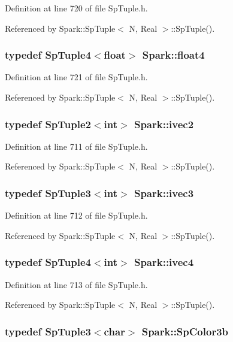 Definition at line 720 of file Sp\-Tuple.h.

Referenced by Spark::Sp\-Tuple$<$ N, Real $>$::Sp\-Tuple().
\subsubsection{\setlength{\rightskip}{0pt plus 5cm}typedef Sp\-Tuple4$<$float$>$ {\bf Spark::float4}}\label{namespaceSpark_a18}


Definition at line 721 of file Sp\-Tuple.h.

Referenced by Spark::Sp\-Tuple$<$ N, Real $>$::Sp\-Tuple().
\subsubsection{\setlength{\rightskip}{0pt plus 5cm}typedef Sp\-Tuple2$<$int$>$ {\bf Spark::ivec2}}\label{namespaceSpark_a10}


Definition at line 711 of file Sp\-Tuple.h.

Referenced by Spark::Sp\-Tuple$<$ N, Real $>$::Sp\-Tuple().
\subsubsection{\setlength{\rightskip}{0pt plus 5cm}typedef Sp\-Tuple3$<$int$>$ {\bf Spark::ivec3}}\label{namespaceSpark_a11}


Definition at line 712 of file Sp\-Tuple.h.

Referenced by Spark::Sp\-Tuple$<$ N, Real $>$::Sp\-Tuple().
\subsubsection{\setlength{\rightskip}{0pt plus 5cm}typedef Sp\-Tuple4$<$int$>$ {\bf Spark::ivec4}}\label{namespaceSpark_a12}


Definition at line 713 of file Sp\-Tuple.h.

Referenced by Spark::Sp\-Tuple$<$ N, Real $>$::Sp\-Tuple().
\subsubsection{\setlength{\rightskip}{0pt plus 5cm}typedef Sp\-Tuple3$<$char$>$ {\bf Spark::Sp\-Color3b}}\label{namespaceSpark_a22}


